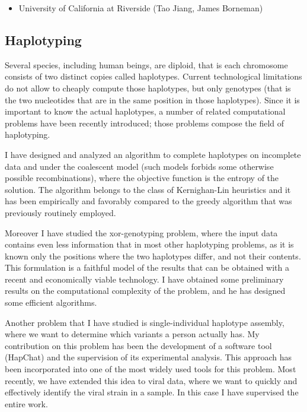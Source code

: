 \documentclass[11pt,a4paper,roman]{moderncv}
\begin{document}
\begin{itemize}
\item
      University of California at Riverside (Tao Jiang, James Borneman)
\end{itemize}

\subsection{Haplotyping}\label{haplotyping}

Several species, including human beings, are diploid, that is each
chromosome consists of two distinct copies called haplotypes. Current
technological limitations do not allow to cheaply compute those
haplotypes, but only genotypes (that is the two nucleotides that are in
the same position in those haplotypes). Since it is important to know
the actual haplotypes, a number of related computational problems have
been recently introduced; those problems compose the field of
haplotyping.

I have designed and analyzed an algorithm to complete haplotypes on
incomplete data and under the coalescent model (such models forbids some
otherwise possible recombinations), where the objective function is the
entropy of the solution. The algorithm belongs to the class of
Kernighan-Lin heuristics and it has been empirically and favorably
compared to the greedy algorithm that was previously routinely employed.

Moreover I have studied the xor-genotyping problem, where the input data
contains even less information that in most other haplotyping problems,
as it is known only the positions where the two haplotypes differ, and
not their contents. This formulation is a faithful model of the results
that can be obtained with a recent and economically viable technology.
I have obtained some preliminary results on the computational complexity
of the problem, and he has designed some efficient algorithms.

Another problem that I have studied is single-individual haplotype assembly, where we want to
determine which variants a person actually has.
My contribution on this problem has been the development of a software tool
(HapChat) and the supervision of its experimental analysis.
This approach has been incorporated into one of the most widely used tools for
this problem.
Most recently, we have extended this idea to viral data, where we want to
quickly and effectively identify the viral strain in a sample.
In this case I have supervised the entire work.
\end{document}
